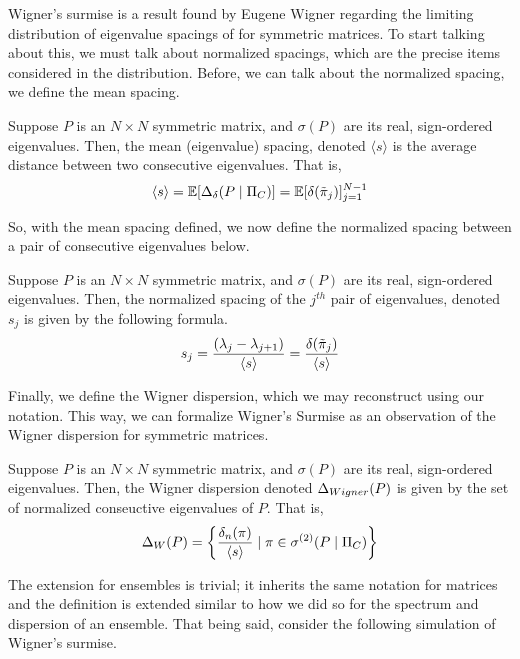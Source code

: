 Wigner's surmise is a result found by Eugene Wigner regarding the limiting distribution of eigenvalue spacings of for symmetric matrices.
To start talking about this, we must talk about normalized spacings, which are the precise items considered in the distribution.
Before, we can talk about the normalized spacing, we define the mean spacing.

\begin{definition}
Suppose $P$ is an $N \times N$ symmetric matrix, and $\sigma(P)$ are its real, sign-ordered eigenvalues.
Then, the mean (eigenvalue) spacing, denoted $\langle s \rangle$ is the average distance between two consecutive eigenvalues. That is,
$$\langle s \rangle = \mathbb{E}[\Delta_\delta(P \mid \Pi_C)] = \mathbb{E}[\delta({\tilde{\pi}}_{j})]_{j = 1}^{N - 1}$$
\end{definition}

\noindent So, with the mean spacing defined, we now define the normalized spacing between a pair of consecutive eigenvalues below.

\begin{definition}
Suppose $P$ is an $N \times N$ symmetric matrix, and $\sigma(P)$ are its real, sign-ordered eigenvalues.
Then, the normalized spacing of the $j^{th}$ pair of eigenvalues, denoted $s_j$ is given by the following formula.
$$s_j = \frac{(\lambda_j - \lambda_{j+1})}{{\langle s \rangle}} = \frac{\delta({\tilde{\pi}}_{j})}{\langle s \rangle}$$
\end{definition}

Finally, we define the Wigner dispersion, which we may reconstruct using our notation. This way, we can formalize Wigner's Surmise as
an observation of the Wigner dispersion for symmetric matrices.

\begin{definition}
Suppose $P$ is an $N \times N$ symmetric matrix, and $\sigma(P)$ are its real, sign-ordered eigenvalues.
Then, the Wigner dispersion denoted $\Delta_{Wigner}(P)$ is given by the set of normalized conseuctive eigenvalues of $P$. That is,
$$ \Delta_{W}(P) = \left\{ \frac{\delta_n(\pi)}{{\langle s \rangle}} \mid \pi \in {\sigma^{(2)}}(P \mid \Pi_C) \right\} $$
\end{definition}

The extension for ensembles is trivial; it inherits the same notation for matrices and the definition is extended similar to how we
did so for the spectrum and dispersion of an ensemble. That being said, consider the following simulation of Wigner's surmise.




